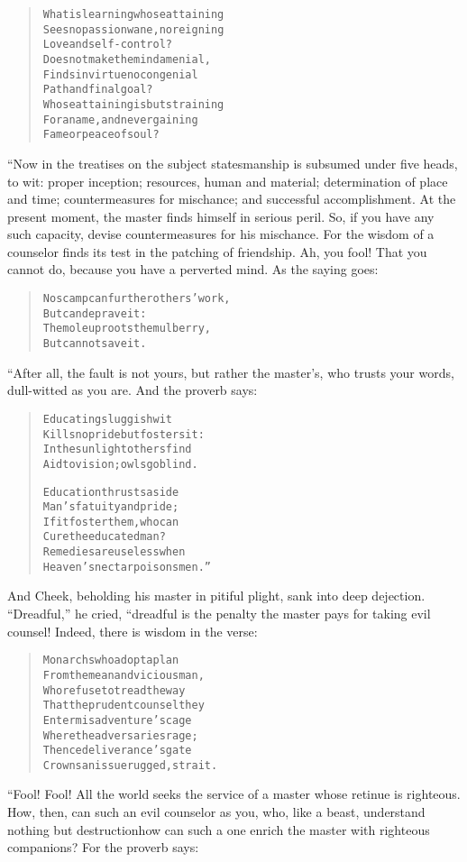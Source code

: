 \documentclass[article, twoside, 14pt]{memoir}
\renewenvironment{verbatim}{%
\begin{quote}%
\vskip -10pt%
\begin{alltt}\normalfont\large}{\end{alltt}%
\end{quote}%
\vskip -10pt
} %
\begin{document}
\begin{verbatim}
What is learning whose attaining
Sees no passion wane, no reigning
    Love and self-control?
Does not make the mind a menial,
Finds in virtue no congenial
    Path and final goal?
Whose attaining is but straining
For a name, and never gaining
    Fame or peace of soul?
\end{verbatim}
“Now in the treatises on the subject statesmanship is subsumed
under five heads, to wit: proper inception; resources, human and
material; determination of place and time; countermeasures for
mischance; and successful accomplishment. At the present moment,
the master finds himself in serious peril. So, if you have any such
capacity, devise countermeasures for his mischance. For the wisdom
of a counselor finds its test in the patching of friendship. Ah,
you fool! That you cannot do, because you have a perverted mind. As
the saying goes:

\begin{verbatim}
No scamp can further others' work,
    But can deprave it:
The mole uproots the mulberry,
    But cannot save it.
\end{verbatim}
“After all, the fault is not yours, but rather the master's, who
trusts your words, dull-witted as you are. And the proverb says:

\begin{verbatim}
Educating sluggish wit
Kills no pride but fosters it:
In the sunlight others find
Aid to vision; owls go blind.

Education thrusts aside
Man's fatuity and pride;
If it foster them, who can
Cure the educated man?
Remedies are useless when
Heaven's nectar poisons men.”
\end{verbatim}
And Cheek, beholding his master in pitiful plight, sank into deep
dejection. ``Dreadful,'' he cried, “dreadful is the penalty the
master pays for taking evil counsel! Indeed, there is wisdom in the
verse:

\begin{verbatim}
Monarchs who adopt a plan
From the mean and vicious man,
Who refuse to tread the way
That the prudent counsel{\textemdash}they
Enter misadventure's cage
Where the adversaries rage;
Thence deliverance's gate
Crowns an issue rugged, strait.
\end{verbatim}
“Fool! Fool! All the world seeks the service of a master whose
retinue is righteous. How, then, can such an evil counselor as you,
who, like a beast, understand nothing but destruction{\textemdash}how can
such a one enrich the master with righteous companions? For the
proverb says:
\end{document}
